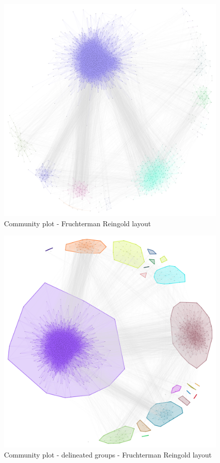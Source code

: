 \documentclass[12pt, a4paper]{article}
\begin{document}
\begin{figure}[p]
    \centering
    \includegraphics[width=\textwidth]{src/youtube/hdg_com/hdg_com}
    \caption{Community plot - Fruchterman Reingold layout}
    \label{fig:hdg_com}
\end{figure}

\begin{figure}[p]
    \centering
    \includegraphics[width=\textwidth]{src/youtube/hdg_com/hdg_com_marked}
    \caption{Community plot - delineated groups - Fruchterman Reingold layout}
    \label{fig:hdg_com_marked}
\end{figure}
\end{document}
